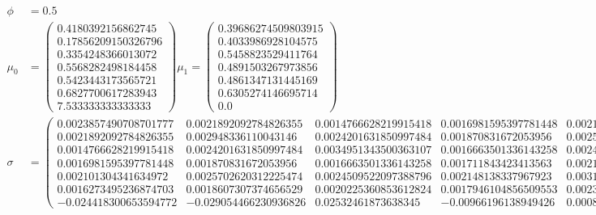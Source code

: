 \documentclass[parskip=half,a4paper]{scrartcl}
\begin{document}
\begin{align*}
    \phi &= 0.5\\
    \mu_0 &=
    \begin{pmatrix}
    0.4180392156862745\\
    0.17856209150326796\\
    0.3354248366013072\\
    0.5568282498184458\\
    0.5423443173565721\\
    0.6827700617283943\\
    7.533333333333333
    \end{pmatrix}
    \mu_1 = \begin{pmatrix}
    0.39686274509803915\\
    0.4033986928104575\\
    0.5458823529411764\\
    0.4891503267973856\\
    0.4861347131445169\\
    0.6305274146695714\\
    0.0
    \end{pmatrix}\\
    \sigma &=
\begin{pmatrix}
 0.0023857490708701777 &  0.0021892092784826355 & 0.0014766628219915418 &  0.0016981595397781448 & 0.002101304341634972  & 0.0016273495236874703 & -0.024418300653594772\\
 0.0021892092784826355 &  0.002948336110043146  & 0.0024201631850997484 &  0.001870831672053956  & 0.0025702620312225474 & 0.0018607307374656529 & -0.029054466230936826\\
 0.0014766628219915418 &  0.0024201631850997484 & 0.0034951343500363107 &  0.0016663501336143258 & 0.0024509522097388796 & 0.0020225360853612824 &  0.02532461873638345\\
 0.0016981595397781448 &  0.001870831672053956  & 0.0016663501336143258 &  0.001711843423413563  & 0.002148138337967923  & 0.0017946104856509553 & -0.00966196138949426\\
 0.002101304341634972  &  0.0025702620312225474 & 0.0024509522097388796 &  0.002148138337967923  & 0.0031567000278923257 & 0.00239791708291355   &  0.0008216987412248645\\
 0.0016273495236874703 &  0.0018607307374656529 & 0.0020225360853612824 &  0.0017946104856509553 & 0.00239791708291355   & 0.0022084171152532963 &  0.010007231905107605\\
-0.024418300653594772  & -0.029054466230936826  & 0.02532461873638345   & -0.00966196138949426   & 0.0008216987412248645 & 0.010007231905107605  &  6.924444444444444
    \end{pmatrix}
\end{align*}
\end{document}
